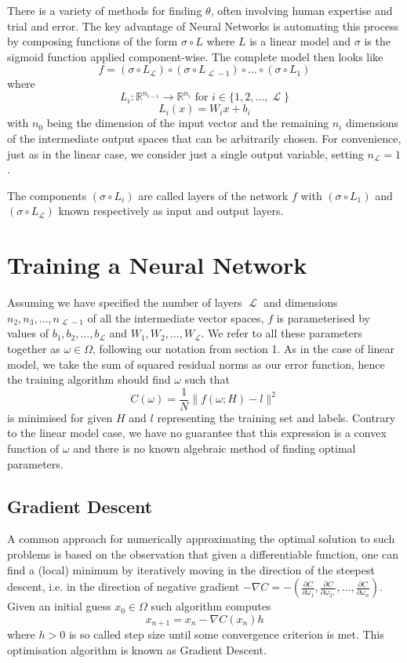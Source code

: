 \documentclass[a4paper]{article}
\theoremstyle{break}
\newcommand{\R}{\mathbb{R}}
\DeclareMathOperator{\La}{\mathcal{L}}
\begin{document}
There is a variety of methods for finding $\theta$, often involving human expertise and trial and error. The key advantage of Neural Networks is automating this process by composing functions of the form $ \sigma \circ L$ where $L$ is a linear model and $\sigma$ is the sigmoid function applied component-wise.
The complete model then looks like
$$ f = (\sigma \circ L_{\La}) \circ (\sigma \circ L_{\La - 1}) \circ \ldots \circ (\sigma \circ L_{1}) $$
where
$$ L_i : \R^{n_{i-1}} \to \R^{n_{i}} \text{ for } i \in \{1, 2, \ldots, \La \} $$
$$ L_i(x) = W_i x + b_i $$
with $ n_0 $ being the dimension of the input vector and the remaining $ n_i $ dimensions of the intermediate output spaces that can be arbitrarily chosen. For convenience, just as in the linear case, we consider just a single output variable, setting $ n_{\La} = 1 $. 

The components $ (\sigma \circ L_{i}) $ are called layers of the network $f$ with $ (\sigma \circ L_{1}) $ and $ (\sigma \circ L_{\La}) $ known respectively as input and output layers.

\section{Training a Neural Network}

Assuming we have specified the number of layers $ \La $ and dimensions $ n_2, n_3, \ldots, n_{\La-1} $ of all the intermediate vector spaces,
$f$ is parameterised by values of $ b_1, b_2, \ldots, b_{\La} $ and $ W_1, W_2, \ldots, W_{\La} $.
We refer to all these parameters together as $ \omega \in \Omega $, following our notation from section 1.
As in the case of linear model, we take the sum of squared residual norms as our error function, hence the training algorithm should find $ \omega $ such that
    $$ C(\omega) =  \frac{1}{N} \| f(\omega; H) - l \|^2  $$
is minimised for given $H$ and $l$ representing the training set and labels.
Contrary to the linear model case, we have no guarantee that this expression is a convex function of $ \omega $ and there is no known algebraic method of finding optimal parameters.

\subsection{Gradient Descent}
A common approach for numerically approximating the optimal solution to such problems is based on the observation that given a differentiable function, one can find a (local) minimum by iteratively moving in the direction of the steepest descent, i.e. in the direction of negative gradient $ - \nabla C  = - ( \frac{\partial C}{\partial \omega_1}, \frac{\partial C}{\partial \omega_2, }, ..., \frac{\partial C}{\partial \omega_n})$. Given an initial guess $x_0 \in \Omega$ such algorithm computes
    $$ x_{n+1} = x_{n} - \nabla C (x_n) h $$
where $h > 0$ is so called step size until some convergence criterion is met. This optimisation algorithm is known as Gradient Descent.
\end{document}
